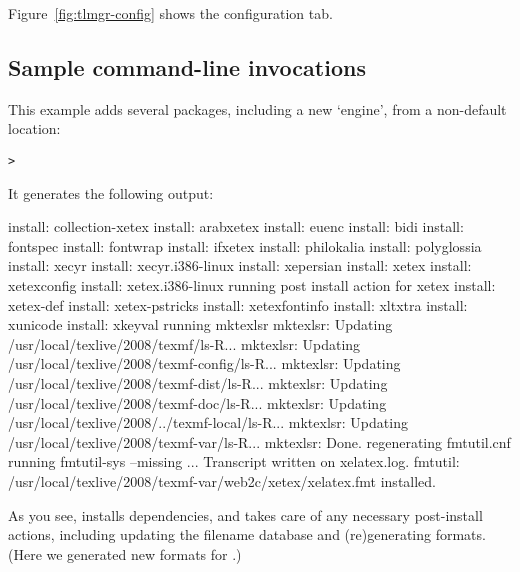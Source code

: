 \documentclass{article}
\begin{document}
Figure~\ref{fig:tlmgr-config} shows the configuration tab.

\subsection{Sample  command-line invocations}

This example adds several packages, including a new `engine', from a
non-default location:

\begin{alltt}
> 
\end{alltt}
It generates the following output:
\begin{fverbatim}
install: collection-xetex
install: arabxetex
install: euenc
install: bidi
install: fontspec
install: fontwrap
install: ifxetex
install: philokalia
install: polyglossia
install: xecyr
install: xecyr.i386-linux
install: xepersian
install: xetex
install: xetexconfig
install: xetex.i386-linux
running post install action for xetex
install: xetex-def
install: xetex-pstricks
install: xetexfontinfo
install: xltxtra
install: xunicode
install: xkeyval
running mktexlsr
mktexlsr: Updating /usr/local/texlive/2008/texmf/ls-R...
mktexlsr: Updating /usr/local/texlive/2008/texmf-config/ls-R...
mktexlsr: Updating /usr/local/texlive/2008/texmf-dist/ls-R...
mktexlsr: Updating /usr/local/texlive/2008/texmf-doc/ls-R...
mktexlsr: Updating /usr/local/texlive/2008/../texmf-local/ls-R...
mktexlsr: Updating /usr/local/texlive/2008/texmf-var/ls-R...
mktexlsr: Done.
regenerating fmtutil.cnf
running fmtutil-sys --missing
...
Transcript written on xelatex.log.
fmtutil: /usr/local/texlive/2008/texmf-var/web2c/xetex/xelatex.fmt installed.
\end{fverbatim}
As you see,  installs dependencies, and takes care of any
necessary post-install actions, including updating the filename database
and (re)generating formats.  (Here we generated new formats for \XeTeX.)
\end{document}
